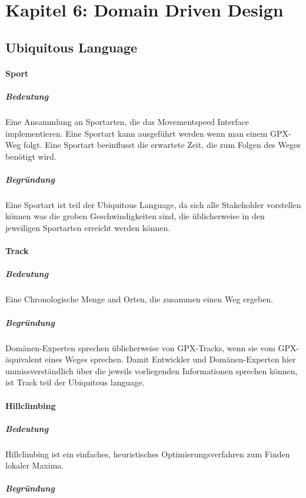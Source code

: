 \section{Kapitel 6: Domain Driven Design}

\subsection{Ubiquitous Language}

\paragraph{Sport}

\subparagraph{Bedeutung}

Eine Ansammlung an Sportarten, die das Movementspeed Interface implementieren. Eine Sportart kann ausgeführt werden wenn man einem GPX-Weg folgt. Eine Sportart beeinflusst die erwartete Zeit, die zum Folgen des Weges benötigt wird.

\subparagraph{Begründung}

Eine Sportart ist teil der Ubiquitous Language, da sich alle Stakeholder vorstellen können was die groben Geschwindigkeiten sind, die üblicherweise in den jeweiligen Sportarten erreicht werden können.

\paragraph{Track}

\subparagraph{Bedeutung}

Eine Chronologische Menge and Orten, die zusammen einen Weg ergeben. 

\subparagraph{Begründung}

Domänen-Experten sprechen üblicherweise von GPX-Tracks, wenn sie vom GPX-äquivalent eines Weges sprechen. Damit Entwickler und Domänen-Experten hier unmissverständlich über die jeweils vorliegenden Informationen sprechen können, ist Track teil der Ubiquitous language.

\paragraph{Hillclimbing}



\subparagraph{Bedeutung}

Hillclimbing ist ein einfaches, heuristisches Optimierungsverfahren zum Finden lokaler Maxima.

\subparagraph{Begründung}

